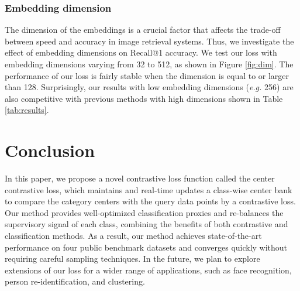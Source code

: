 \documentclass[10pt,twocolumn,letterpaper]{article}
\begin{document}
\subsubsection{Embedding dimension}
\label{sec:dimension}

The dimension of the embeddings is a crucial factor that affects the trade-off between speed and accuracy in image retrieval systems. Thus, we investigate the effect of embedding dimensions on Recall@1 accuracy. We test our loss with embedding dimensions varying from 32 to 512, as shown in Figure \ref{fig:dim}. The performance of our loss is fairly stable when the dimension is equal to or larger than 128. Surprisingly, our results with low embedding dimensions (\textit{e.g.} 256) are also competitive with previous methods with high dimensions shown in Table \ref{tab:results}.


\section{Conclusion}
\label{sec:conclusion}
In this paper, we propose a novel contrastive loss function called the center contrastive loss, which maintains and real-time updates a class-wise center bank to compare the category centers with the query data points by a contrastive loss. Our method provides well-optimized classification proxies and re-balances the supervisory signal of each class, combining the benefits of both contrastive and classification methods. As a result, our method achieves state-of-the-art performance on four public benchmark datasets and converges quickly without requiring careful sampling techniques. In the future, we plan to explore extensions of our loss for a wider range of applications, such as face recognition, person re-identification, and clustering.






{\small
\normalem


}
\end{document}
